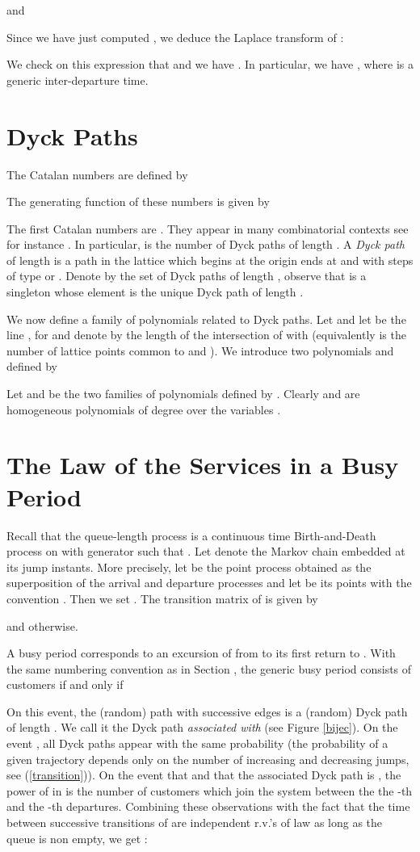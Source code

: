 \documentclass[11pt,a4paper]{article}
\numberwithin{equation}{section}
\newcommand{\1}{\mathbbm{1}}
\begin{document}
and

Since we have just computed , we
deduce the Laplace transform of :

We check on this expression that  and we have
. In particular, we have , where  is a generic inter-departure time.


\section{Dyck Paths}
\label{se-dyck}

The Catalan numbers  are defined by

The generating function of these numbers is given by

The first Catalan numbers are
. They appear in many combinatorial
contexts see for instance \cite{GKPa,stan2}. In particular, 
is the number of Dyck paths of length . A {\em Dyck path}  of
length  is a  path in the lattice  which begins
at the origin  ends at  and with steps of type
 or . Denote by  the set of Dyck paths of
length , observe that  is a singleton whose element is
the unique Dyck path of length .

We now define a family of polynomials
related to Dyck paths.
Let  and let
 be the line , for  and denote by
 the length of the intersection of  with 
(equivalently  is the number of lattice points common
to  and ). We introduce two polynomials 
and  defined by

Let   and  be the two families
of polynomials defined by .
Clearly  and  are homogeneous polynomials of degree 
over the  variables .

\section{The Law of the Services in a Busy Period}
Recall that the queue-length process  is a continuous time Birth-and-Death process on  with
generator  such that . Let  denote the Markov chain embedded at its jump instants.
More precisely, let  be the point process obtained as the superposition  of the arrival and departure processes and let 
 be its points with the convention . Then we set . The transition matrix of  is given by

and  otherwise.

A busy period corresponds to an excursion of  from  to its first return to .
With the same numbering convention as in Section ,
the generic busy period  consists of  customers if and only if

On this event, the (random) path with  successive edges
 is a (random) Dyck path of
length . We call it the Dyck path {\em associated with} 
(see  Figure \ref{bijec}). On the event , all Dyck
paths appear with the same probability (the probability of a given
trajectory  depends only on the number of increasing and
decreasing jumps, see (\ref{transition})). On the event that
 and that the associated Dyck path is , the
power of  in  is the number of customers which
join the system between the the -th and the -th
departures. Combining these observations with the fact that the
time between successive transitions of  are
independent r.v.'s of law  as long as the
queue is non empty, we get :
\end{document}
